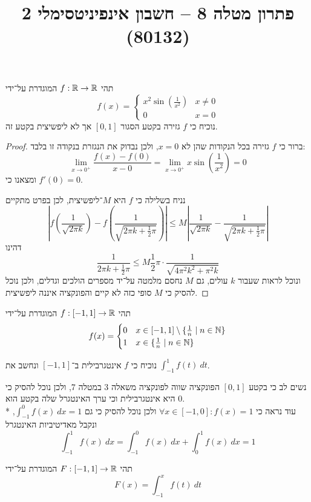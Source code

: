
\usepackage{tikz}
\DeclareMathOperator\arcsinh{arcsinh}
\title{פתרון מטלה 8 – חשבון אינפיניטסימלי 2 (80132)}


\maketitle
\maketitleprint{}

\Question{}
תהי $f : \mathbb{R} \to \mathbb{R}$ המוגדרת על־ידי
\[
	f(x) = \begin{cases}
		x^2 \sin(\frac{1}{x^2}) & x \ne 0 \\
		0 & x = 0
	\end{cases}
\]
נוכיח כי $f$ גזירה בקטע הסגור $[0, 1]$ אך לא ליפשיצית בקטע זה.
\begin{proof}
	ברור כי $f$ גזירה בכל הנקודות שהן לא $x = 0$, ולכן נבדוק את הנגזרת בנקודה זו בלבד:
	\[
		\lim_{x \to 0^+} \frac{f(x) - f(0)}{x - 0}
		= \lim_{x \to 0^+} x \sin(\frac{1}{x^2})
		= 0
	\]
	ומצאנו כי $f'(0) = 0$.

	נניח בשלילה כי $f$ היא $M$־ליפשיצית, לכן בפרט מתקיים
	\[
		|f(\frac{1}{\sqrt{2 \pi k}}) - f(\frac{1}{\sqrt{2 \pi k + \frac{1}{2} \pi}})| \le M | \frac{1}{\sqrt{2 \pi k}} - \frac{1}{\sqrt{2 \pi k + \frac{1}{2} \pi}}|
	\]
	דהינו
	\[
		\frac{1}{2 \pi k + \frac{1}{2} \pi} \le M \frac{1}{2} \pi \cdot \frac{1}{\sqrt{4 \pi^2 k^2 + \pi^2 k}}
	\]
	ונוכל לראות שעבור $k$ עולים, גם $M$ נחסם מלמטה על־יד מספרים הולכים וגדלים, ולכן נוכל להסיק כי $M$ סופי כזה לא קיים והפונקציה איננה ליפשיצית.
\end{proof}

\Question{}
תהי $f : [-1, 1] \to \mathbb{R}$ המוגדרת על־ידי
\[
	f(x) = \begin{cases}
		0 & x \in [-1, 1] \setminus \{ \frac{1}{n} \mid n \in \mathbb{N} \} \\
		1 & x \in \{ \frac{1}{n} \mid n \in \mathbb{N} \}
	\end{cases}
\]

\Subquestion{}
נוכיח כי $f$ אינטגרבילית ב־$[-1, 1]$ ונחשב את $\int_{-1}^{1} f(t)\ dt$.

נשים לב כי בקטע $[0, 1]$ הפונקציה שווה לפונקציה משאלה 3 במטלה 7, ולכן נוכל להסיק כי היא אינטגרבילית וכי ערך האינטגרל שלה בקטע הוא $0$. \\*
עוד נראה כי $\forall x \in [-1, 0] : f(x) = 1$ ולכן נוכל להסיק כי גם $\int_{-1}^{0} f(x)\ dx = 1$, ונקבל מאדיטיביות האינטגרל
\[
	\int_{-1}^{1} f(x)\ dx
	= \int_{-1}^{0} f(x)\ dx + \int_{0}^{1} f(x)\ dx
	= 1
\]

\Subquestion{}
תהי $F : [-1, 1] \to \mathbb{R}$ המוגדרת על־ידי
\[
	F(x) = \int_{-1}^{x} f(t)\ dt
\]

